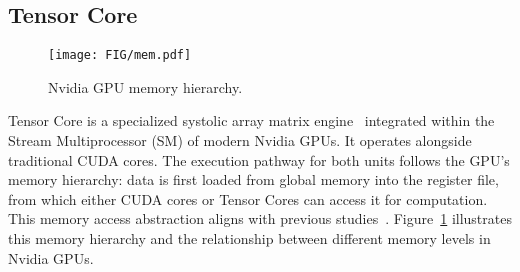 \subsection{Tensor Core}\label{sec:tensorcore}

\begin{figure}[t!]
    \centering
    \texttt{[image: FIG/mem.pdf]}
    \vspace{-25pt}
    \caption{Nvidia GPU memory hierarchy.}
    \label{fig:tcarch}
\end{figure}

Tensor Core is a specialized systolic array matrix engine~\cite{9460517} integrated within the Stream Multiprocessor (SM) of modern Nvidia GPUs. It operates alongside traditional CUDA cores. The execution pathway for both units follows the GPU's memory hierarchy: data is first loaded from global memory into the register file, from which either CUDA cores or Tensor Cores can access it for computation. This memory access abstraction aligns with previous studies~\cite{10579250,9931992}. Figure~\ref{fig:tcarch} illustrates this memory hierarchy and the relationship between different memory levels in Nvidia GPUs.

